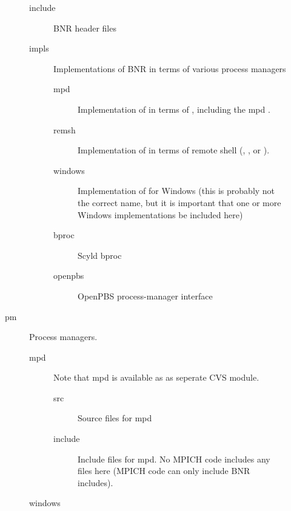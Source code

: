 \documentclass{article}
\begin{document}
\begin{description}
\begin{description}
    \begin{description}
      \item[include]BNR header files
      \item[impls]Implementations of BNR in terms of various process managers
      \begin{description}
          \item[mpd]Implementation of  in terms of , 
           including the mpd .  
          \item[remsh]Implementation of  in terms of remote
          shell (, , or ).
          \item[windows]Implementation of  for Windows (this is
          probably not the correct name, but it is important that one or
          more Windows implementations be included here)
          \item[bproc]Scyld bproc
          \item[openpbs]OpenPBS process-manager interface
      \end{description}
    \end{description}
    \item[pm]Process managers.  
        \begin{description}
        \item[mpd]Note that mpd is available as
            as seperate CVS module.
          \begin{description}
          \item[src]Source files for mpd
          \item[include]Include files for mpd.  No MPICH code includes
           any files here (MPICH code can only include BNR includes).
          \end{description}
        \item[windows]
        \end{description}


\end{description}
\end{description}
\end{document}
